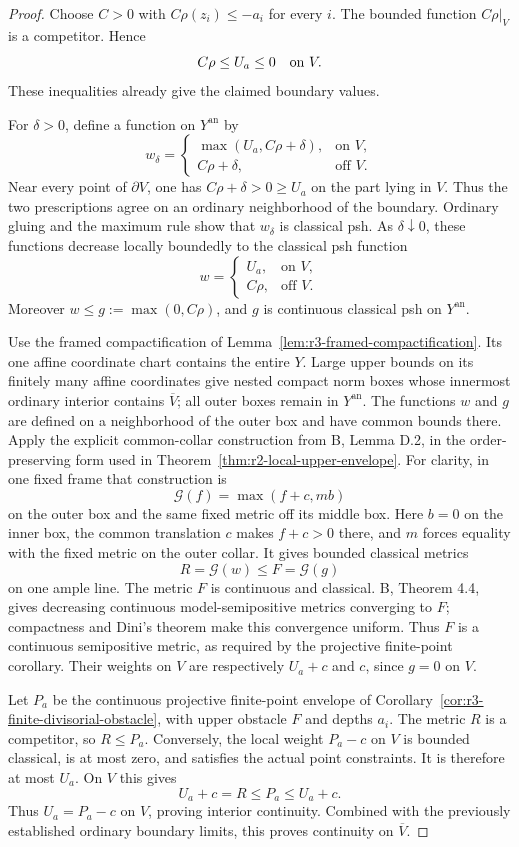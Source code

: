 \documentclass[11pt,a4paper]{article}
\numberwithin{equation}{section}
\theoremstyle{definition}
\theoremstyle{remark}
\newcommand{\an}{\mathrm{an}}
\begin{document}
\begin{proof}
Choose $C>0$ with $C\rho(z_i)\leq-a_i$ for every $i$.
The bounded function $C\rho|_V$ is a competitor. Hence
\[
 C\rho\leq U_a\leq0\quad\hbox{on }V.
\]
These inequalities already give the claimed boundary values.

For $\delta>0$, define a function on $Y^{\an}$ by
\[
 w_\delta=
 \begin{cases}
 \max(U_a,C\rho+\delta),&\text{on }V,\\
 C\rho+\delta,&\text{off }V.
 \end{cases}
\]
Near every point of $\partial V$, one has $C\rho+\delta>0\geq U_a$
on the part lying in $V$. Thus the two prescriptions agree on an
ordinary neighborhood of the boundary. Ordinary gluing and the
maximum rule show that $w_\delta$ is classical psh.
As $\delta\downarrow0$, these functions decrease locally boundedly
to the classical psh function
\[
 w=
 \begin{cases}U_a,&\text{on }V,\\ C\rho,&\text{off }V.
 \end{cases}
\]
Moreover $w\leq g:=\max(0,C\rho)$, and $g$ is continuous
classical psh on $Y^{\an}$.

Use the framed compactification of
Lemma~\ref{lem:r3-framed-compactification}. Its one affine
coordinate chart contains the entire $Y$. Large upper bounds
on its finitely many affine coordinates give nested compact
norm boxes whose innermost ordinary interior contains
$\overline V$; all outer boxes remain in $Y^{\an}$.
The functions $w$ and $g$ are defined on a neighborhood of the
outer box and have common bounds there. Apply the explicit
common-collar construction from B, Lemma D.2, in the
order-preserving form used in
Theorem~\ref{thm:r2-local-upper-envelope}.
For clarity, in one fixed frame that construction is
\[
 \mathcal G(f)=\max(f+c,mb)
\]
on the outer box and the same fixed metric off its middle box.
Here $b=0$ on the inner box, the common translation $c$ makes
$f+c>0$ there, and $m$ forces equality with the fixed metric on
the outer collar. It gives bounded classical metrics
\[
 R=\mathcal G(w)\leq F=\mathcal G(g)
\]
on one ample line. The metric $F$ is continuous and classical.
B, Theorem 4.4, gives decreasing continuous model-semipositive
metrics converging to $F$; compactness and Dini's theorem make
this convergence uniform. Thus $F$ is a continuous semipositive
metric, as required by the projective finite-point corollary.
Their weights
on $V$ are respectively $U_a+c$ and $c$, since $g=0$ on $V$.

Let $P_a$ be the continuous projective finite-point envelope of
Corollary~\ref{cor:r3-finite-divisorial-obstacle}, with upper
obstacle $F$ and depths $a_i$. The metric $R$ is a competitor,
so $R\leq P_a$. Conversely, the local weight $P_a-c$ on $V$
is bounded classical, is at most zero, and satisfies the actual
point constraints. It is therefore at most $U_a$. On $V$ this
gives
\[
 U_a+c=R\leq P_a\leq U_a+c.
\]
Thus $U_a=P_a-c$ on $V$, proving interior continuity. Combined
with the previously established ordinary boundary limits, this
proves continuity on $\overline V$.
\end{proof}
\end{document}
